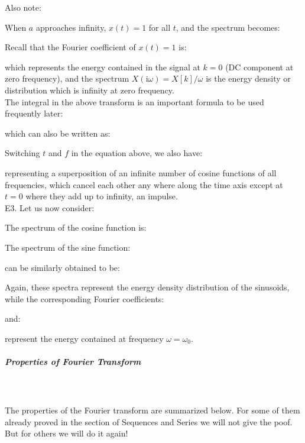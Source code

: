 	
	\begin{tcolorbox}[colframe=black,colback=white,sharp corners]
	 Also note:
	
	When $a$ approaches infinity, $x(t)=1$ for all $t$, and the spectrum becomes:
	
	Recall that the Fourier coefficient of $x(t)=1$ is:
	
	which represents the energy contained in the signal at $k=0$ (DC component at zero frequency), and the spectrum $X(\mathrm{i}\omega)=X[k]/\omega$ is the energy density or distribution which is infinity at zero frequency.\\
	
	The integral in the above transform is an important formula to be used frequently later:
	
	which can also be written as:
	
	Switching $t$ and $f$ in the equation above, we also have:
	
	representing a superposition of an infinite number of cosine functions of all
	frequencies, which cancel each other any where along the time axis except at
	$t=0$ where they add up to infinity, an impulse. \\
	
	E3. Let us now consider:
	
	The spectrum of the cosine function is:
		
	\end{tcolorbox}
	
	\begin{tcolorbox}[colframe=black,colback=white,sharp corners]
	
	The spectrum of the sine function:
	
	can be similarly obtained to be:
	
	Again, these spectra represent the energy density distribution of the sinusoids, while the corresponding Fourier coefficients:
	
	and:
	
	represent the energy contained at frequency $\omega=\omega_0$.
	\end{tcolorbox}
	
	
	
	
	\subparagraph{Properties of Fourier Transform}\mbox{}\\\\	
	The properties of the Fourier transform are summarized below. For some of them already proved in the section of Sequences and Series we will not give the poof. But for others we will do it again! 
	
